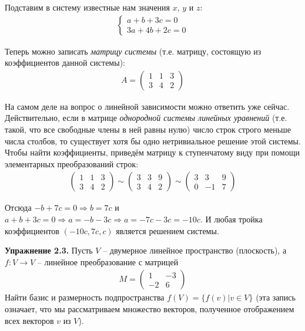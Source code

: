 \documentclass[a4paper, 12pt]{article}
\begin{document}
\begin{spacing}{1.5}
Подставим в систему известные нам значения $x$, $y$ и $z$:
 \begin{align*}
 \begin{cases}
    a + b + 3c= 0 \\
    3a + 4b + 2c = 0
\end{cases}
\end{align*}

Теперь можно записать \textit{матрицу системы} (т.е. матрицу, состоящую из коэффициентов данной системы):
\begin{align*}
A = 
\begin{pmatrix}
1 & 1 & 3 \\
3 & 4 & 2 
\end{pmatrix}
\end{align*}

На самом деле на вопрос о линейной зависимости можно ответить уже сейчас. Действительно, если в матрице \textit{однородной системы линейных уравнений} (т.е. такой, что все свободные члены в ней равны нулю) число строк строго меньше числа столбов, то существует хотя бы одно нетривиальное решение этой системы. Чтобы найти коэффициенты, приведём матрицу к ступенчатому виду при помощи элементарных преобразований строк:
\begin{align*}
\begin{pmatrix}
1 & 1 & 3 \\
3 & 4 & 2 
\end{pmatrix}
\sim
\begin{pmatrix}
3 & 3 & 9 \\
3 & 4 & 2 
\end{pmatrix}
\sim
\begin{pmatrix}
3 & 3 & 9 \\
0 & -1 & 7 
\end{pmatrix}
\end{align*}

Отсюда $-b + 7c = 0 \Rightarrow b = 7c$ и $a + b + 3c = 0 \Rightarrow a = -b - 3c \Rightarrow a = -7c - 3c = -10c$. И любая тройка коэффициентов $(-10c, 7c, c)$ является решением системы.

\setlength{\leftskip}{0ex}
\setlength{\rightskip}{0ex}

\textbf{Упражнение 2.3.} Пусть $V$ -- двумерное линейное пространство (плоскость), а $f: V \rightarrow V$ -- линейное преобразование с матрицей
\begin{align*}
M = 
\begin{pmatrix}
1 & -3 \\
-2 & 6 
\end{pmatrix}
\end{align*}
Найти базис и размерность подпространства $f(V) = \{f(v) | v \in V \}$ (эта запись означает, что мы рассматриваем множество векторов, полученное отображением всех векторов $v$ из $V$).


\end{spacing}
\end{document}
